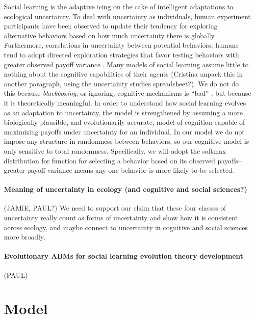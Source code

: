 \documentclass[letterpaper,11.5pt]{scrartcl}
\begin{document}
Social learning is the adaptive icing on the cake of intelligent adaptations to ecological uncertainty. To deal with uncertainty as individuals, human experiment participants have been observed to update their tendency for exploring alternative behaviors based on how much uncertainty there is globally. Furthermore, correlations in uncertainty between potential behaviors, humans tend to adopt directed exploration strategies that favor testing behaviors with greater observed payoff variance \cite{Wilson2014,Gershman2019}. Many models of social learning assume little to nothing about the cognitive capabilities of their agents (Cristina unpack this in another paragraph, using the uncertainty studies spreadsheet?). We do not do this because \emph{blackboxing}, or ignoring, cognitive mechanisms is “bad” \cite[p. 658]{Heyes2016, Kendal2018}, but because it is theoretically meaningful. In order to understand how social learning evolves as an adaptation to uncertainty, the model is strengthened by assuming a more biologically plausible, and evolutionarily accurate, model of cognition capable of maximizing payoffs under uncertainty for an individual. In our model we do not impose any structure in randomness between behaviors, so our cognitive model is only sensitive to total randomness. Specifically, we will adopt the softmax distribution for function for selecting a behavior based on its observed payoffs–greater payoff variance means any one behavior is more likely to be selected.

\paragraph{Meaning of uncertainty in ecology (and cognitive and social sciences?) } (JAMIE, PAUL?)
We need to support our claim that these four classes of uncertainty really 
count as forms of uncertainty and show how it is consistent across ecology,
and maybe connect to uncertainty in cognitive and social sciences more broadly.

\paragraph{Evolutionary ABMs for social learning evolution theory development} (PAUL)


\section{Model}
\end{document}
